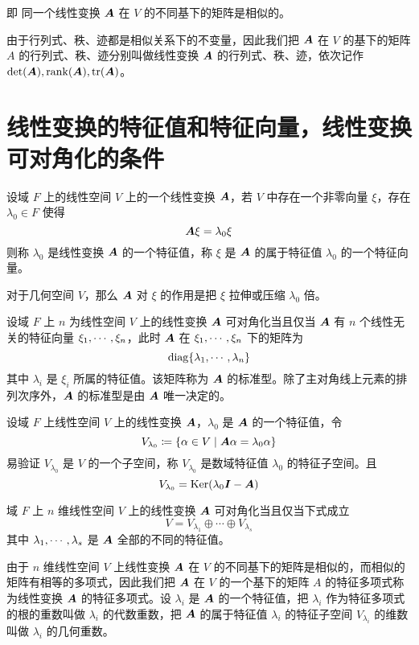 即 同一个线性变换 $\boldsymbol{A}$ 在 $V$ 的不同基下的矩阵是相似的。

由于行列式、秩、迹都是相似关系下的不变量，因此我们把 $\boldsymbol{A}$ 在 $V$ 的基下的矩阵 $A$ 的行列式、秩、迹分别叫做线性变换 $\boldsymbol{A}$ 的行列式、秩、迹，依次记作 $\det(\boldsymbol{A}),\operatorname{rank}(\boldsymbol{A}),\operatorname{tr}(\boldsymbol{A})$。

\section{线性变换的特征值和特征向量，线性变换可对角化的条件}

\begin{definition}
    设域 $F$ 上的线性空间 $V$ 上的一个线性变换 $\boldsymbol{A}$，若 $V$ 中存在一个非零向量 $\xi$，存在 $\lambda_0 \in F$ 使得
    \[ \boldsymbol{A} \xi = \lambda_0\xi \]
    则称 $\lambda_0$ 是线性变换 $\boldsymbol{A}$ 的一个特征值，称 $\xi$ 是 $\boldsymbol{A}$ 的属于特征值 $\lambda_0$ 的一个特征向量。
\end{definition}

对于几何空间 $V$，那么 $\boldsymbol{A}$ 对 $\xi$ 的作用是把 $\xi$ 拉伸或压缩 $\lambda_0$ 倍。

\begin{theorem}
    设域 $F$ 上 $n$ 为线性空间 $V$ 上的线性变换 $\boldsymbol{A}$ 可对角化当且仅当 $\boldsymbol{A}$ 有 $n$ 个线性无关的特征向量 $\xi_1,\cdots,\xi_n$，此时 $\boldsymbol{A}$ 在 $\xi_1,\cdots,\xi_n$ 下的矩阵为
    \[ \operatorname{diag}\{\lambda_1,\cdots,\lambda_n\} \]
    其中 $\lambda_i$ 是 $\xi_i$ 所属的特征值。该矩阵称为 $\boldsymbol{A}$ 的标准型。除了主对角线上元素的排列次序外，$\boldsymbol{A}$ 的标准型是由 $\boldsymbol{A}$ 唯一决定的。
\end{theorem}

设域 $F$ 上线性空间 $V$ 上的线性变换 $\boldsymbol{A}$，$\lambda_0$ 是 $\boldsymbol{A}$ 的一个特征值，令
\[ V_{\lambda_0} \coloneqq \{ \alpha \in V \mid \boldsymbol{A}\alpha = \lambda_0\alpha \} \]
易验证 $V_{\lambda_0}$ 是 $V$ 的一个子空间，称 $V_{\lambda_0}$ 是数域特征值 $\lambda_0$ 的特征子空间。且
\[ V_{\lambda_0} = \operatorname{Ker}(\lambda_0\boldsymbol{I} - \boldsymbol{A}) \]

\begin{proposition}
    域 $F$ 上 $n$ 维线性空间 $V$ 上的线性变换 $\boldsymbol{A}$ 可对角化当且仅当下式成立
    \[ V = V_{\lambda_1} \oplus \cdots \oplus V_{\lambda_s} \]
    其中 $\lambda_1,\cdots,\lambda_s$ 是 $\boldsymbol{A}$ 全部的不同的特征值。
\end{proposition}

由于 $n$ 维线性空间 $V$ 上线性变换 $\boldsymbol{A}$ 在 $V$ 的不同基下的矩阵是相似的，而相似的矩阵有相等的多项式，因此我们把 $\boldsymbol{A}$ 在 $V$ 的一个基下的矩阵 $A$ 的特征多项式称为线性变换 $\boldsymbol{A}$ 的特征多项式。设 $\lambda_i$ 是 $\boldsymbol{A}$ 的一个特征值，把 $\lambda_i$ 作为特征多项式的根的重数叫做 $\lambda_i$ 的代数重数，把 $\boldsymbol{A}$ 的属于特征值 $\lambda_i$ 的特征子空间 $V_{\lambda_i}$ 的维数叫做 $\lambda_i$ 的几何重数。 

